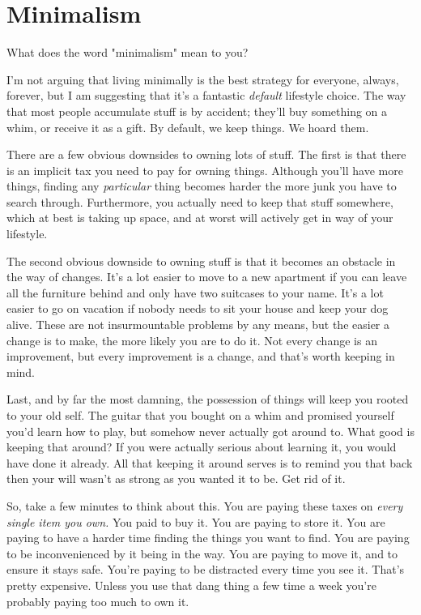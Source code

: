\documentclass[../the-millions-of-gestures.tex]{subfiles}
\begin{document}
\chapter{Minimalism}

What does the word "minimalism" mean to you?


I'm not arguing that living minimally is the best strategy for everyone, always,
forever, but I am suggesting that it's a fantastic \emph{default} lifestyle
choice. The way that most people accumulate stuff is by accident; they'll buy
something on a whim, or receive it as a gift. By default, we keep things. We
hoard them.

There are a few obvious downsides to owning lots of stuff. The first is that
there is an implicit tax you need to pay for owning things. Although you'll have
more things, finding any \emph{particular} thing becomes harder the more junk
you have to search through. Furthermore, you actually need to keep that stuff
somewhere, which at best is taking up space, and at worst will actively get in
way of your lifestyle.

The second obvious downside to owning stuff is that it becomes an obstacle in
the way of changes. It's a lot easier to move to a new apartment if you can
leave all the furniture behind and only have two suitcases to your name. It's a
lot easier to go on vacation if nobody needs to sit your house and keep your dog
alive. These are not insurmountable problems by any means, but the easier a
change is to make, the more likely you are to do it. Not every change is an
improvement, but every improvement is a change, and that's worth keeping in
mind.

Last, and by far the most damning, the possession of things will keep you rooted
to your old self. The guitar that you bought on a whim and promised yourself
you'd learn how to play, but somehow never actually got around to. What good is
keeping that around? If you were actually serious about learning it, you would
have done it already. All that keeping it around serves is to remind you that
back then your will wasn't as strong as you wanted it to be. Get rid of it.


So, take a few minutes to think about this. You are paying these taxes on
\emph{every single item you own.} You paid to buy it. You are paying to store
it. You are paying to have a harder time finding the things you want to find.
You are paying to be inconvenienced by it being in the way. You are paying to
move it, and to ensure it stays safe. You're paying to be distracted every time
you see it. That's pretty expensive. Unless you use that dang thing a few time a
week you're probably paying too much to own it.
\end{document}
